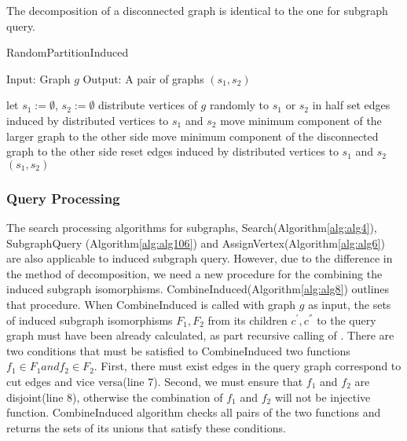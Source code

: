The decomposition of a disconnected graph is identical to the one for subgraph query.

\begin{algorithm}
\caption{RandomPartitionInduced}
\label{alg:alg15}
\begin{algorithmic}
\STATE Input: Graph $g$
\STATE Output: A pair of graphs $(s_1, s_2)$
\end{algorithmic}
\begin{algorithmic}[1]
\STATE let $s_1 := \emptyset$, $s_2 := \emptyset$
\STATE distribute vertices of $g$ randomly to $s_1$ or $s_2$ in half
\STATE set edges induced by distributed vertices to $s_1$ and $s_2$ 
\REPEAT
		\STATE move minimum component of the larger graph to the other side
	\ELSE
		\STATE move minimum component of the disconnected graph to the other side
	\ENDIF
	\STATE reset edges induced by distributed vertices to $s_1$ and $s_2$ 
\RETURN $(s_1,s_2)$
\end{algorithmic}
\end{algorithm}

\subsubsection{Query Processing}
The search processing algorithms for subgraphs, Search(Algorithm\ref{alg:alg4}), SubgraphQuery (Algorithm\ref{alg:alg106}) and AssignVertex(Algorithm\ref{alg:alg6}) 
are also applicable to induced subgraph query. However, due to the difference in the method of decomposition, we need a new procedure for the combining the 
induced subgraph isomorphisms. CombineInduced(Algorithm\ref{alg:alg8}) outlines that procedure.
When CombineInduced is called with graph $g$ as input, the sets of induced subgraph isomorphisms $F_1, F_2$ from its children $c^{'}, c^{''}$ 
to the query graph must have been already calculated, as part recursive calling of \label{alg:alg106}.
There are two conditions that must be satisfied to CombineInduced two functions $f_1 \in F_1 and f_2 \in F_2$.
First, there must exist edges in the query graph correspond to cut edges and vice versa(line 7).
Second, we must ensure that $f_1$ and $f_2$ are disjoint(line 8), otherwise the combination of $f_1$ and $f_2$ will not be injective function.
CombineInduced algorithm checks all pairs of the two functions and returns the sets of its unions that satisfy these conditions.

